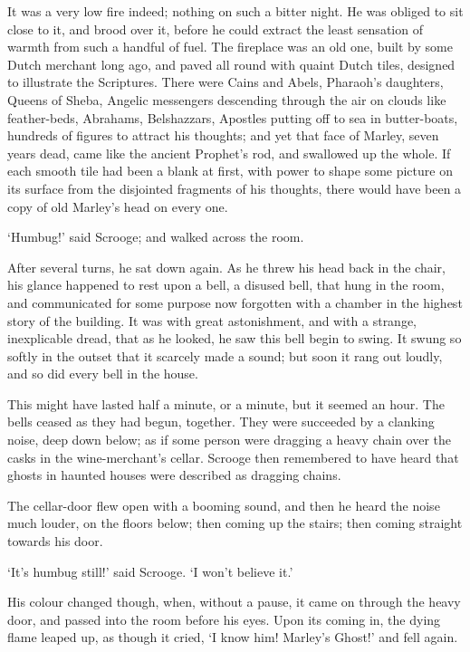 \documentclass[11pt,twoside]{article}\makeatletter
\begin{document}
It was a very low fire indeed; nothing on such a bitter night. He was obliged to sit close to it, and brood over it, before he could extract the least sensation of warmth from such a handful of fuel. The fireplace was an old one, built by some Dutch merchant long ago, and paved all round with quaint Dutch tiles, designed to illustrate the Scriptures. There were Cains and Abels, Pharaoh's daughters, Queens of Sheba, Angelic messengers descending through the air on clouds like feather-beds, Abrahams, Belshazzars, Apostles putting off to sea in butter-boats, hundreds of figures to attract his thoughts; and yet that face of Marley, seven years dead, came like the ancient Prophet's rod, and swallowed up the whole. If each smooth tile had been a blank at first, with power to shape some picture on its surface from the disjointed fragments of his thoughts, there would have been a copy of old Marley's head on every one. \par
‘Humbug!’ said Scrooge; and walked across the room.\par
After several turns, he sat down again. As he threw his head back in the chair, his glance happened to rest upon a bell, a disused bell, that hung in the room, and communicated for some purpose now forgotten with a chamber in the highest story of the building. It was with great astonishment, and with a strange, inexplicable dread, that as he looked, he saw this bell begin to swing. It swung so softly in the outset that it scarcely made a sound; but soon it rang out loudly, and so did every bell in the house. \par
This might have lasted half a minute, or a minute, but it seemed an hour. The bells ceased as they had begun, together. They were succeeded by a clanking noise, deep down below; as if some person were dragging a heavy chain over the casks in the wine-merchant's cellar. Scrooge then remembered to have heard that ghosts in haunted houses were described as dragging chains. \par
The cellar-door flew open with a booming sound, and then he heard the noise much louder, on the floors below; then coming up the stairs; then coming straight towards his door.\par
‘It's humbug still!’ said Scrooge. ‘I won't believe it.’\par
His colour changed though, when, without a pause, it came on through the heavy door, and passed into the room before his eyes. Upon its coming in, the dying flame leaped up, as though it cried, ‘I know him! Marley's Ghost!’ and fell again.\par
\end{document}
